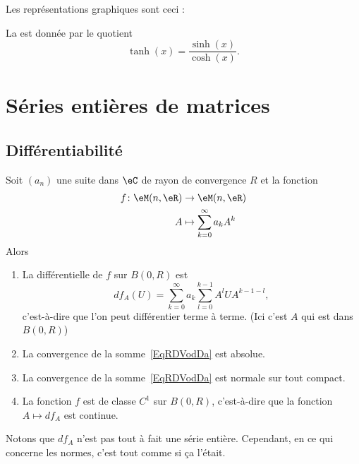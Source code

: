 Les représentations graphiques sont ceci :
\begin{center}
   
\end{center}

La  est donnée par le quotient
\begin{equation}
    \tanh(x)=\frac{ \sinh(x) }{ \cosh(x) }.
\end{equation}

\section{Séries entières de matrices}

\subsection{Différentiabilité}

\begin{proposition} \label{PropAMBXKgV}
    Soit \( (a_n)\) une suite dans \( \eC\) de rayon de convergence \( R\) et la fonction
    \begin{equation}
        \begin{aligned}
            f\colon \eM(n,\eR)&\to \eM(n,\eR) \\
            A&\mapsto \sum_{k=0}^{\infty}a_kA^k
        \end{aligned}
    \end{equation}
    Alors
    \begin{enumerate}
        \item
            La différentielle de \( f\) sur \( B(0,R)\) est
            \begin{equation}    \label{EqRDVodDa}
                df_A(U)=\sum_{k=0}^{\infty}a_k\sum_{l=0}^{k-1}A^lUA^{k-1-l},
            \end{equation}
            c'est-à-dire que l'on peut différentier terme à terme. (Ici c'est \( A\) qui est dans \( B(0,R)\))
        \item
            La convergence de la somme~\ref{EqRDVodDa} est absolue.
        \item
            La convergence de la somme~\ref{EqRDVodDa} est normale sur tout compact.
        \item
            La fonction \( f\) est de classe \( C^1\) sur \( B(0,R)\), c'est-à-dire que la fonction \( A\mapsto df_A\) est continue.
    \end{enumerate}
\end{proposition}
Notons que \( df_A\) n'est pas tout à fait une série entière. Cependant, en ce qui concerne les normes, c'est tout comme si ça l'était.

